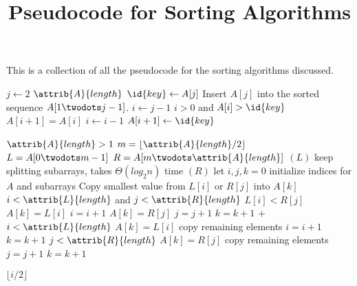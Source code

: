 \documentclass{article}
\title{Pseudocode for Sorting Algorithms}
\author{}
\date{}
\begin{document}
\maketitle

This is a collection of all the pseudocode for the sorting algorithms discussed.

\begin{codebox}
\li \For $j \gets 2$ \To $\attrib{A}{length}$
\li     \Do
            $\id{key} \gets A[j]$
\li         \Comment Insert $A[j]$ into the sorted sequence $A[1 \twodots j-1]$.
\li         $i \gets j-1$
\li         \While $i > 0$ and $A[i] > \id{key}$
\li             \Do
                    $A[i + 1] = A[i]$
\li                 $i \gets i-1$
                \End
\li         $A[i+1] \gets \id{key}$
        \End
\end{codebox}

\begin{codebox}
\li \If $\attrib{A}{length} > 1$
\li \Then
        $m = \lfloor \attrib{A}{length}/2 \rfloor$
\li     $L = A[0 \twodots m-1]$
\li     $R = A[m \twodots \attrib{A}{length}]$
\li     {}$(L)$ \Comment keep splitting subarrays, takes $\Theta{(log_2{n})}$ time
\li     {}$(R)$
\li     let $i, j, k = 0$ \Comment initialize indices for $A$ and subarrays
\li     \Comment Copy smallest value from $L[i]$ or $R[j]$ into $A[k]$
\li     \While $i < \attrib{L}{length}$ and $j < \attrib{R}{length}$
\li     \Do
            \If $L[i] < R[j]$
\li         \Then
                $A[k] = L[i]$
\li             $i = i + 1$
\li         \Else
\li             $A[k] = R[j]$
\li             $j = j + 1$
            \End
\li     $k = k + 1$
        \End+
\li     \While $i < \attrib{L}{length}$
\li     \Do
            $A[k] = L[i]$ \Comment copy remaining elements
\li         $i = i + 1$
\li         $k = k + 1$
        \End
\li     \While $j < \attrib{R}{length}$
\li     \Do
            $A[k] = R[j]$ \Comment copy remaining elements
\li         $j = j + 1$
\li         $k = k + 1$
        \End
    \End
\end{codebox}

\newpage

\begin{codebox}
\li \Return $\lfloor i/2 \rfloor$
\end{codebox}
\end{document}
